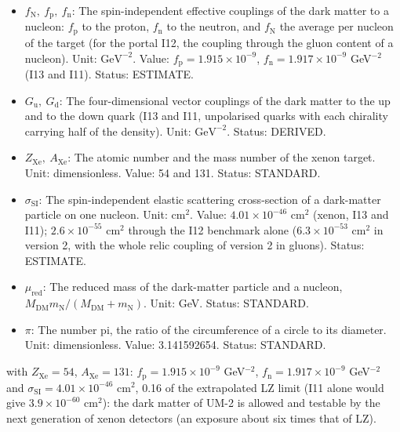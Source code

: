 \documentclass[
  10pt,
]{article}
\providecommand{\tightlist}{%
  \setlength{\itemsep}{0pt}\setlength{\parskip}{0pt}}
\begin{document}
\begin{itemize}
\tightlist
\item
  \(f_{\mathrm{N}},\ f_{\mathrm{p}},\ f_{\mathrm{n}}\): The
  spin-independent effective couplings of the dark matter to a nucleon:
  \(f_{\mathrm{p}}\) to the proton, \(f_{\mathrm{n}}\) to the neutron,
  and \(f_{\mathrm{N}}\) the average per nucleon of the target (for the
  portal I12, the coupling through the gluon content of a nucleon).
  Unit: \(\mathrm{GeV}^{-2}\). Value:
  \(f_{\mathrm{p}} = 1.915\times10^{-9}\),
  \(f_{\mathrm{n}} = 1.917\times10^{-9}\) GeV\(^{-2}\) (I13 and I11).
  Status: ESTIMATE.
\item
  \(G_{\mathrm{u}},\ G_{\mathrm{d}}\): The four-dimensional vector
  couplings of the dark matter to the up and to the down quark (I13 and
  I11, unpolarised quarks with each chirality carrying half of the
  density). Unit: \(\mathrm{GeV}^{-2}\). Status: DERIVED.
\item
  \(Z_{\mathrm{Xe}},\ A_{\mathrm{Xe}}\): The atomic number and the mass
  number of the xenon target. Unit: dimensionless. Value: 54 and 131.
  Status: STANDARD.
\item
  \(\sigma_{\mathrm{SI}}\): The spin-independent elastic scattering
  cross-section of a dark-matter particle on one nucleon. Unit:
  \(\mathrm{cm}^2\). Value: \(4.01\times10^{-46}\) cm\(^2\) (xenon, I13
  and I11); \(2.6\times10^{-55}\) cm\(^2\) through the I12 benchmark
  alone (\(6.3\times10^{-53}\) cm\(^2\) in version 2, with the whole
  relic coupling of version 2 in gluons). Status: ESTIMATE.
\item
  \(\mu_{\mathrm{red}}\): The reduced mass of the dark-matter particle
  and a nucleon,
  \(M_{\mathrm{DM}}m_{\mathrm{N}}/(M_{\mathrm{DM}} + m_{\mathrm{N}})\).
  Unit: GeV. Status: STANDARD.
\item
  \(\pi\): The number pi, the ratio of the circumference of a circle to
  its diameter. Unit: dimensionless. Value: 3.141592654. Status:
  STANDARD.
\end{itemize}

with \(Z_{\mathrm{Xe}} = 54\), \(A_{\mathrm{Xe}} = 131\):
\(f_{\mathrm{p}} = 1.915\times10^{-9}\) GeV\(^{-2}\),
\(f_{\mathrm{n}} = 1.917\times10^{-9}\) GeV\(^{-2}\) and
\(\sigma_{\mathrm{SI}} = 4.01\times10^{-46}\) cm\(^2\), 0.16 of the
extrapolated LZ limit (I11 alone would give \(3.9\times10^{-60}\)
cm\(^2\)): the dark matter of UM-2 is allowed and testable by the next
generation of xenon detectors (an exposure about six times that of LZ).
\end{document}
